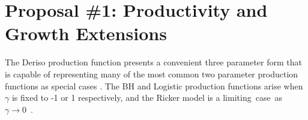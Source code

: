\documentclass[12pt]{article}
\begin{document}
%
%
%
%

%
\clearpage
\section*{Proposal \#1: Productivity and Growth Extensions}

%
The Deriso production function presents a convenient three parameter form 
that is capable of representing many of the most common two parameter production 
functions as special cases . The BH and 
Logistic production functions arise when $\gamma$ is fixed to -1 or 1 
respectively, and the Ricker model is a \mbox{limiting case as $\gamma\rightarrow0$ .}
\end{document}
